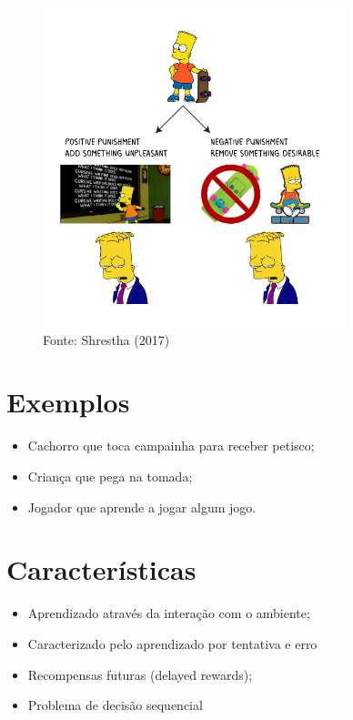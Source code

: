 \documentclass{article}
\begin{document}
            \begin{figure}[ht]
                \centering
                \includegraphics[width=250pt]{bart-punishment.png}
                \caption{Fonte: Shrestha (2017)}
                \label{fig:bart-punicao}
            \end{figure}
            
    \section{Exemplos}
    
        \begin{itemize}
            \item Cachorro que toca campainha para receber petisco;
            \item Criança que pega na tomada;
            \item Jogador que aprende a jogar algum jogo.
        \end{itemize}
            
    \section{Características}
    
        \begin{itemize}
            \item Aprendizado através da interação com o ambiente;
            \item Caracterizado pelo aprendizado por tentativa e erro
            \item Recompensas futuras (delayed rewards);
            \item Problema de decisão sequencial
        \end{itemize}
        
\end{document}
